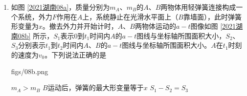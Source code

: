 \documentclass[\gkver]{gaokaozhenti}
\begin{document}
\begin{enumerate}
{	所以 A 正确；

	B．核心舱在轨道上飞行的速度小于$7.9 \Ukms$，因为第一宇宙速度是最大的环绕速度，所以 B 错误；

	C．根据

	$T = 2\pi \sqrt{\frac{R^{3}}{GM}}$

	可知轨道半径越大周期越大，则其周期比同步卫星的周期小，小于$24 \Uh$，所以 C 正确；

	D．卫星做圆周运动时万有引力提供向心力有

	$G\frac{Mm}{r^{2}}=m\frac{v^{2}}{r}$

	解得

	$v=\sqrt{\frac{GM}{R}}$

	则卫星的环绕速度与卫星的质量无关，所以变轨时需要点火减速或者点火加速，增加质量不会改变轨道半径，所以 D 错误；

	故选 AC。
}


\item
如图 \ref{2021湖南08a}，质量分别为$m_{A}$、$m_{B}$的$A$、$B$两物体用轻弹簧连接构成一个系统，外力$F$作用在$A$上，系统静止在光滑水平面上（$B$靠墙面），此时弹簧形变量为$x$。撤去外力并开始计时，$A$、$B$两物体运动的$a-t$图像如图 \ref{2021湖南08b} 所示，$S_{1}$表示0到$t_{1}$时间内$A$的$a-t$图线与坐标轴所围面积大小，$S_{2}$、$S_{3}$分别表示$t_{1}$到$t_{2}$时间内$A$、$B$的$a-t$图线与坐标轴所围面积大小。$A$在$t_{1}$时刻的速度为$v_{0}$。下列说法正确的是 

{figs/08b.png}

{$m_{A}>m_{B}$}
{$B$运动后，弹簧的最大形变量等于$x$}
{$S_{1}-S_{2}=S_{3}$}

\end{enumerate}
\end{document}
